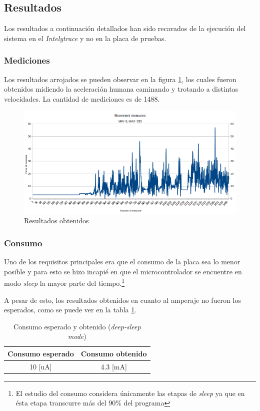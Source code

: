 \documentclass{article}
\newcommand{ \fnsleep }{\footnote{El estudio del consumo considera únicamente las etapas de \emph{sleep} ya que en ésta etapa transcurre más del 90\% del programa}}
\begin{document}
    \subsection{Resultados}
    Los resultados a continuación detallados han sido recavados de la ejecución
    del sistema en el \emph{Intelytrace} y no en la placa de pruebas.

    \subsubsection{Mediciones}
    Los resultados arrojados se pueden observar en la figura 
    \ref{fig:resultados_modulo}, los cuales fueron obtenidos midiendo la 
    aceleración humana caminando y trotando a distintas velocidades. La 
    cantidad de mediciones es de 1488.

    \begin{figure}[h]
        \includegraphics[width=1.0 \textwidth, center]{../segundas/results_module.png}
        \caption{Resultados obtenidos}
        \label{fig:resultados_modulo}
    \end{figure}

    \subsubsection{Consumo}
    Uno de los requisitos principales era que el consumo de la placa sea lo 
    menor posible y para esto se hizo incapié en que el microcontrolador se 
    encuentre en modo \emph{sleep} la mayor parte del tiempo.\fnsleep \par
    A pesar de esto, los resultados obtenidos en cuanto al amperaje no fueron
    los esperados, como se puede ver en la tabla \ref{tab:consumo}.

    \begin{table}[h]
        \centering
        \begin{tabular}{||c|c||} 
            \hline
            Consumo esperado & Consumo obtenido \\ [0.5ex] 
            \hline\hline
            10 [uA] & 4.3 [mA] \\
            \hline
        \end{tabular}
        \caption{Consumo esperado y obtenido (\emph{deep-sleep mode})}
        \label{tab:consumo}
    \end{table}
\end{document}
